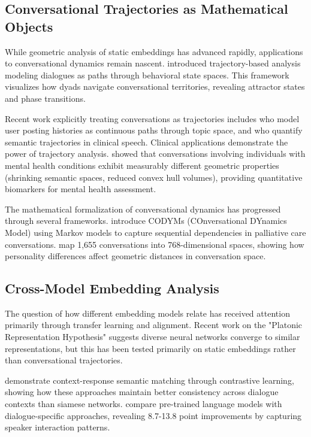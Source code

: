 \documentclass[11pt,letterpaper]{article}
\begin{document}
\subsection{Conversational Trajectories as Mathematical Objects}

While geometric analysis of static embeddings has advanced rapidly, applications to conversational dynamics remain nascent. \citet{brinberg2024dynamic} introduced trajectory-based analysis modeling dialogues as paths through behavioral state spaces. This framework visualizes how dyads navigate conversational territories, revealing attractor states and phase transitions.

Recent work explicitly treating conversations as trajectories includes \citet{toxicity2025trajectory} who model user posting histories as continuous paths through topic space, and \citet{psychiatric2024semantic} who quantify semantic trajectories in clinical speech. Clinical applications demonstrate the power of trajectory analysis. \citet{palominos2024trajectories} showed that conversations involving individuals with mental health conditions exhibit measurably different geometric properties (shrinking semantic spaces, reduced convex hull volumes), providing quantitative biomarkers for mental health assessment.

The mathematical formalization of conversational dynamics has progressed through several frameworks. \citet{clarfeld2020codym} introduce CODYMs (COnversational DYnamics Model) using Markov models to capture sequential dependencies in palliative care conversations. \citet{fischer2024personality} map 1,655 conversations into 768-dimensional spaces, showing how personality differences affect geometric distances in conversation space.

\subsection{Cross-Model Embedding Analysis}

The question of how different embedding models relate has received attention primarily through transfer learning and alignment. Recent work on the "Platonic Representation Hypothesis" \citep{huh2024platonic} suggests diverse neural networks converge to similar representations, but this has been tested primarily on static embeddings rather than conversational trajectories.

\citet{dialoguecse2021} demonstrate context-response semantic matching through contrastive learning, showing how these approaches maintain better consistency across dialogue contexts than siamese networks. \citet{dial2vec2022} compare pre-trained language models with dialogue-specific approaches, revealing 8.7-13.8 point improvements by capturing speaker interaction patterns.
\end{document}
